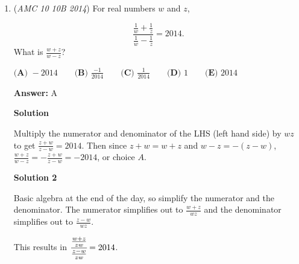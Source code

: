 \begin{enumerate}
Converting feet to yards and minutes to second, we see that the truck travels $\dfrac{b}{18}$ yards every $t$ seconds for $180$ seconds. We see that he does $\dfrac{180}{t}$ cycles of $\dfrac{b}{18}$ yards. Multiplying, we get $\dfrac{180b}{18t}$, or $\dfrac{10b}{t}$, or $\boxed{\textbf{(E)}}$.

 



\textbf{Solution 2}

We set a proportion by letting the $x$ being the number of feet the truck travels in $3$ minutes.

 \begin{align*}\frac{\frac{b}{6}}{t} &= \frac{x}{180} \\\frac{b}{6t} &= \frac{x}{180} \\\frac{180b}{6t} &= x \\x &= \frac{30b}{t}\end{align*}


 Remember $x$ is the number of feet the truck travels, so we divide by $3$ to convert to yards. 

 $\frac{x}{3}=\frac{10b}{t}$, which corresponds to $\boxed{\text{(E)}}$



	\item (\textit{AMC 10 10B 2014}) For real numbers $w$ and $z$, 

 \[\frac{\frac{1}{w} + \frac{1}{z}}{\frac{1}{w} - \frac{1}{z}} = 2014.\]
What is $\frac{w+z}{w-z}$?


 $\textbf{(A) } -2014 \qquad\textbf{(B) } \frac{-1}{2014} \qquad\textbf{(C) } \frac{1}{2014} \qquad\textbf{(D) } 1 \qquad\textbf{(E) } 2014$

 \textbf{Answer: }A



\textbf{Solution}

Multiply the numerator and denominator of the LHS (left hand side) by $wz$ to get $\frac{z+w}{z-w}=2014$. Then since $z+w=w+z$ and $w-z=-(z-w)$, $\frac{w+z}{w-z}=-\frac{z+w}{z-w}=-2014$, or choice $\boxed{A}$.

 



\textbf{Solution 2}

Basic algebra at the end of the day, so simplify the numerator and the denominator. The numerator simplifies out to $\frac{w+z}{wz}$ and the denominator simplifies out to $\frac{z-w}{wz}$. 

 This results in $\cfrac{\frac{w+z}{zw}}{\frac{z-w}{zw}} = 2014$. 


\end{enumerate}
